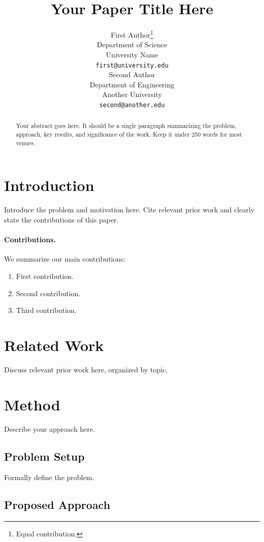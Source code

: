 \documentclass[11pt]{article}
\title{Your Paper Title Here}
\author{
  First Author\thanks{Equal contribution.} \\
  Department of Science\\
  University Name\\
  \texttt{first@university.edu} \\
  \And
  Second Author\footnotemark[1] \\
  Department of Engineering\\
  Another University\\
  \texttt{second@another.edu}
}
\date{}
\begin{document}
\maketitle

\begin{abstract}
Your abstract goes here. It should be a single paragraph summarizing the
problem, approach, key results, and significance of the work. Keep it
under 250 words for most venues.
\end{abstract}

\section{Introduction}
\label{sec:intro}

Introduce the problem and motivation here. Cite relevant prior work
\citep{example2024} and clearly state the contributions of this paper.

\paragraph{Contributions.} We summarize our main contributions:
\begin{enumerate}
    \item First contribution.
    \item Second contribution.
    \item Third contribution.
\end{enumerate}

\section{Related Work}
\label{sec:related}

Discuss relevant prior work here, organized by topic.

\section{Method}
\label{sec:method}

Describe your approach here.

\subsection{Problem Setup}
\label{sec:setup}

Formally define the problem.

\subsection{Proposed Approach}
\label{sec:approach}
\end{document}
